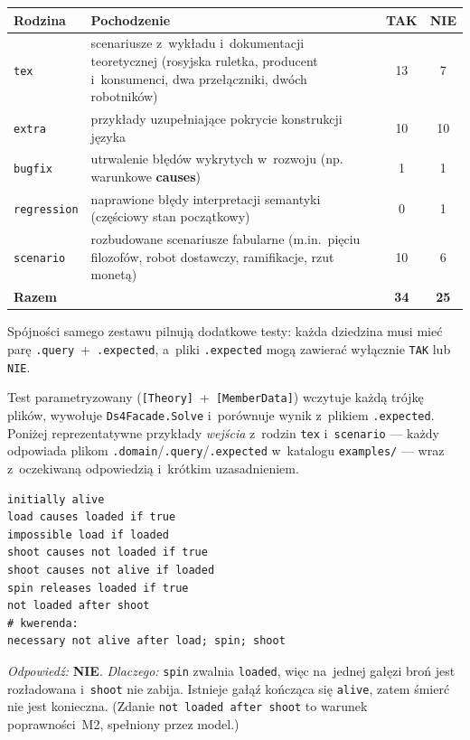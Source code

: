 \documentclass[11pt,a4paper]{article}
\begin{document}
\begin{center}
\small
\begin{tabular}{@{}lp{8.2cm}cc@{}}
\toprule
\textbf{Rodzina} & \textbf{Pochodzenie} & \textbf{TAK} & \textbf{NIE} \\
\midrule
\texttt{tex} & scenariusze z~wykładu i~dokumentacji teoretycznej
  (rosyjska ruletka, producent i~konsumenci, dwa przełączniki,
  dwóch robotników) & 13 & 7 \\
\texttt{extra} & przykłady uzupełniające pokrycie konstrukcji języka
  & 10 & 10 \\
\texttt{bugfix} & utrwalenie błędów wykrytych w~rozwoju
  (np. warunkowe \textbf{causes}) & 1 & 1 \\
\texttt{regression} & naprawione błędy interpretacji semantyki
  (częściowy stan początkowy) & 0 & 1 \\
\texttt{scenario} & rozbudowane scenariusze fabularne (m.in.\ pięciu filozofów,
  robot dostawczy, ramifikacje, rzut monetą) & 10 & 6 \\
\midrule
\textbf{Razem} & & \textbf{34} & \textbf{25} \\
\bottomrule
\end{tabular}
\end{center}

Spójności samego zestawu pilnują dodatkowe testy: każda dziedzina musi mieć
parę \texttt{.query}~+~\texttt{.expected}, a~pliki \texttt{.expected} mogą
zawierać wyłącznie \texttt{TAK} lub \texttt{NIE}.

Test parametryzowany (\texttt{[Theory]}~+~\texttt{[MemberData]}) wczytuje każdą
trójkę plików, wywołuje \texttt{Ds4Facade.Solve} i~porównuje wynik z~plikiem
\texttt{.expected}. Poniżej reprezentatywne przykłady \emph{wejścia} z~rodzin
\texttt{tex} i~\texttt{scenario} --- każdy odpowiada plikom
\texttt{.domain}/\texttt{.query}/\texttt{.expected} w~katalogu \texttt{examples/}
--- wraz z~oczekiwaną odpowiedzią i~krótkim uzasadnieniem.

\begin{lstlisting}[style=ds4code, caption={YSP --- problem strzelania (rodzina tex)}]
initially alive
load causes loaded if true
impossible load if loaded
shoot causes not loaded if true
shoot causes not alive if loaded
spin releases loaded if true
not loaded after shoot
# kwerenda:
necessary not alive after load; spin; shoot
\end{lstlisting}
\emph{Odpowiedź:} \textbf{NIE}. \emph{Dlaczego:} \texttt{spin} zwalnia
\texttt{loaded}, więc na~jednej gałęzi broń jest rozładowana i~\texttt{shoot} nie
zabija. Istnieje gałąź kończąca się \texttt{alive}, zatem śmierć nie jest
konieczna. (Zdanie \texttt{not loaded after shoot} to warunek poprawności~M2,
spełniony przez model.)
\end{document}
